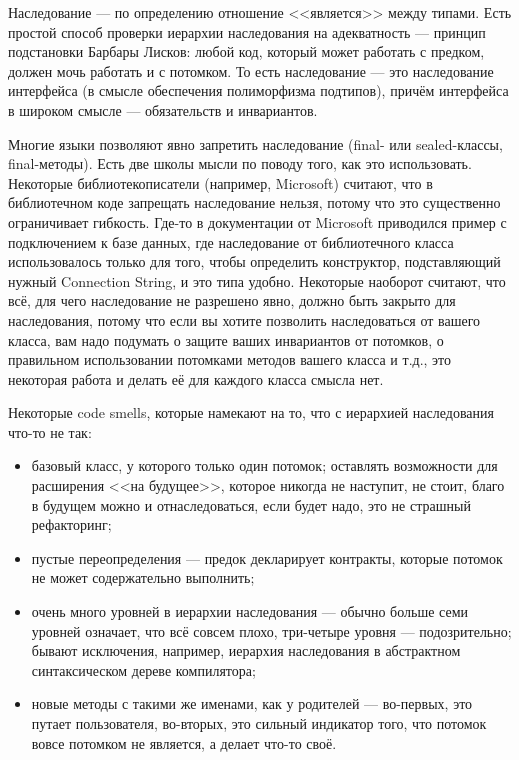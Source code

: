 \documentclass{../text-style}
\begin{document}
Наследование --- по определению отношение <<является>> между типами. Есть простой способ проверки иерархии наследования на адекватность --- принцип подстановки Барбары Лисков: любой код, который может работать с предком, должен мочь работать и с потомком. То есть наследование --- это наследование интерфейса (в смысле обеспечения полиморфизма подтипов), причём интерфейса в широком смысле --- обязательств и инвариантов.

Многие языки позволяют явно запретить наследование (final- или sealed-классы, final-методы). Есть две школы мысли по поводу того, как это использовать. Некоторые библиотекописатели (например, Microsoft) считают, что в библиотечном коде запрещать наследование нельзя, потому что это существенно ограничивает гибкость. Где-то в документации от Microsoft приводился пример с подключением к базе данных, где наследование от библиотечного класса использовалось только для того, чтобы определить конструктор, подставляющий нужный Connection String, и это типа удобно. Некоторые наоборот считают, что всё, для чего наследование не разрешено явно, должно быть закрыто для наследования, потому что если вы хотите позволить наследоваться от вашего класса, вам надо подумать о защите ваших инвариантов от потомков, о правильном использовании потомками методов вашего класса и т.д., это некоторая работа и делать её для каждого класса смысла нет.

Некоторые code smells, которые намекают на то, что с иерархией наследования что-то не так:

\begin{itemize}
    \item базовый класс, у которого только один потомок; оставлять возможности для расширения <<на будущее>>, которое никогда не наступит, не стоит, благо в будущем можно и отнаследоваться, если будет надо, это не страшный рефакторинг;
    \item пустые переопределения --- предок декларирует контракты, которые потомок не может содержательно выполнить;
    \item очень много уровней в иерархии наследования --- обычно больше семи уровней означает, что всё совсем плохо, три-четыре уровня --- подозрительно; бывают исключения, например, иерархия наследования в абстрактном синтаксическом дереве компилятора;
    \item новые методы с такими же именами, как у родителей --- во-первых, это путает пользователя, во-вторых, это сильный индикатор того, что потомок вовсе потомком не является, а делает что-то своё.
\end{itemize}
\end{document}
